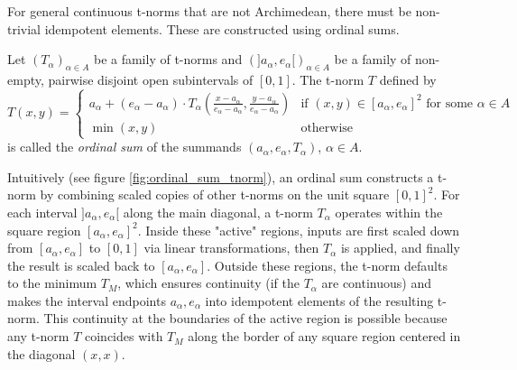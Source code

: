 For general continuous t-norms that are not Archimedean, there must be non-trivial idempotent elements. These are constructed using ordinal sums.
\begin{definition}
Let $(T_\alpha)_{\alpha \in A}$ be a family of t-norms and $(]a_\alpha, e_\alpha[)_{\alpha \in A}$ be a family of non-empty, pairwise disjoint open subintervals of $[0,1]$. The t-norm $T$ defined by
\[
T(x,y) =
\begin{cases}
  a_\alpha + (e_\alpha - a_\alpha) \cdot T_\alpha \left( \frac{x-a_\alpha}{e_\alpha - a_\alpha}, \frac{y-a_\alpha}{e_\alpha - a_\alpha} \right) & \text{if } (x,y) \in [a_\alpha, e_\alpha]^2 \text{ for some } \alpha \in A \\
  \min(x,y) & \text{otherwise}
\end{cases}
\]
is called the \emph{ordinal sum} of the summands $(a_\alpha, e_\alpha, T_\alpha)$, $\alpha \in A$.
\end{definition}
Intuitively (see figure \ref{fig:ordinal_sum_tnorm}), an ordinal sum constructs a t-norm by combining scaled copies of other t-norms on the unit square $[0,1]^2$. For each interval $]a_\alpha, e_\alpha[$ along the main diagonal, a t-norm $T_\alpha$ operates within the square region $[a_\alpha, e_\alpha]^2$. Inside these "active" regions, inputs are first scaled down from $[a_\alpha, e_\alpha]$ to $[0,1]$ via linear transformations, then $T_\alpha$ is applied, and finally the result is scaled back to $[a_\alpha, e_\alpha]$. Outside these regions, the t-norm defaults to the minimum $T_M$, which ensures continuity (if the $T_\alpha$ are continuous) and makes the interval endpoints $a_\alpha, e_\alpha$ into idempotent elements of the resulting t-norm. This continuity at the boundaries of the active region is possible because any t-norm $T$ coincides with $T_M$ along the border of any square region centered in the diagonal $(x,x)$.\\


